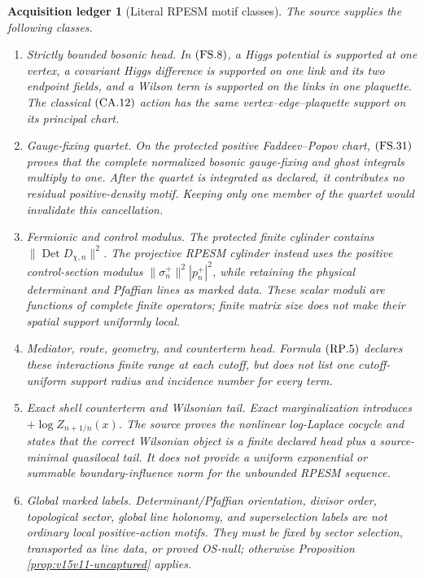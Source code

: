 \documentclass[11pt]{article}
\newtheorem{ledger}[theorem]{Acquisition ledger}
\theoremstyle{remark}
\begin{document}
\begin{ledger}[Literal RPESM motif classes]
\label{led:v15v12-motifs}
The source supplies the following classes.

\begin{enumerate}
\item \emph{Strictly bounded bosonic head.}
      In \({\rm(FS.8)}\), a Higgs potential is supported at one
      vertex, a covariant Higgs difference is supported on one
      link and its two endpoint fields, and a Wilson term is
      supported on the links in one plaquette.  The classical
      \({\rm(CA.12)}\) action has the same vertex--edge--plaquette
      support on its principal chart.
\item \emph{Gauge-fixing quartet.}
      On the protected positive Faddeev--Popov chart,
      \({\rm(FS.31)}\) proves that the complete normalized
      bosonic gauge-fixing and ghost integrals multiply to one.
      After the quartet is integrated as declared, it contributes
      no residual positive-density motif.  Keeping only one member
      of the quartet would invalidate this cancellation.
\item \emph{Fermionic and control modulus.}
      The protected finite cylinder contains
      \(\|\operatorname{Det}D_{\chi,n}\|^2\).  The projective
      RPESM cylinder instead uses the positive control-section
      modulus
      \(\|\sigma_n^+\|^2|p_n^+|^2\), while retaining the physical
      determinant and Pfaffian lines as marked data.  These scalar
      moduli are functions of complete finite operators; finite
      matrix size does not make their spatial support uniformly
      local.
\item \emph{Mediator, route, geometry, and counterterm head.}
      Formula \({\rm(RP.5)}\) declares these interactions finite
      range at each cutoff, but does not list one cutoff-uniform
      support radius and incidence number for every term.
\item \emph{Exact shell counterterm and Wilsonian tail.}
      Exact marginalization introduces
      \(+\log Z_{n+1/n}(x)\).  The source proves the nonlinear
      log-Laplace cocycle and states that the correct Wilsonian
      object is a finite declared head plus a source-minimal
      quasilocal tail.  It does not provide a uniform exponential
      or summable boundary-influence norm for the unbounded RPESM
      sequence.
\item \emph{Global marked labels.}
      Determinant/Pfaffian orientation, divisor order, topological
      sector, global line holonomy, and superselection labels are
      not ordinary local positive-action motifs.  They must be
      fixed by sector selection, transported as line data, or
      proved OS-null; otherwise Proposition
      \ref{prop:v15v11-uncaptured} applies.
\end{enumerate}
\end{ledger}
\end{document}
